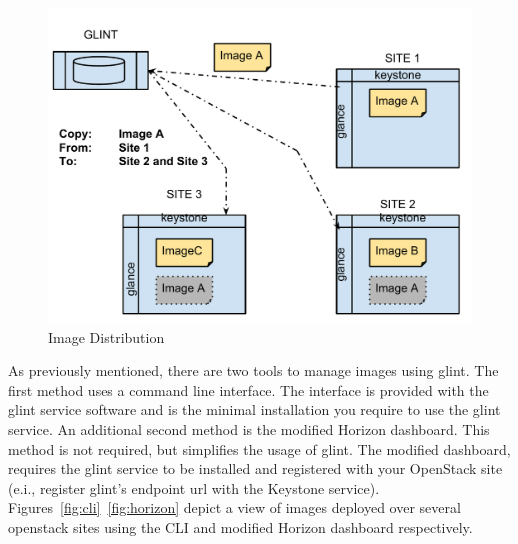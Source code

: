 \documentclass[a4paper]{jpconf}
\begin{document}
\begin{figure}[H]
\begin{center}
\includegraphics[width=36pc]{images/archglint.pdf}
\caption{\label{fig:glintfigure}Image Distribution }
\end{center}
\end{figure}

As previously mentioned, there are two tools to manage images using glint. The first method uses a command line interface. The interface is provided with the glint service software and is the minimal installation you require to use the glint service. An additional second method is the modified Horizon dashboard. This method is not required, but simplifies the usage of glint. The modified dashboard, requires the glint service to be installed and registered with your OpenStack site (e.i., register glint's endpoint url with the Keystone service). Figures~\ref{fig:cli}~\ref{fig:horizon} depict a view of images deployed over several openstack sites using the CLI and modified Horizon dashboard respectively.
\end{document}
